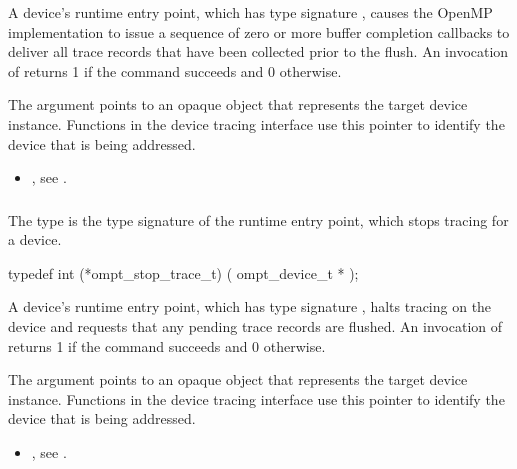 \descr
A device's  runtime entry point, which has type
signature , causes the OpenMP implementation to 
issue a sequence of zero or more buffer completion callbacks to deliver 
all trace records that have been collected prior to the flush. An invocation 
of  returns 1 if the command succeeds and 0 otherwise.

\argdesc
The  argument points to an opaque object that represents
the target device instance. Functions in the device tracing interface
use this pointer to identify the device that is being addressed.

\crossreferences
\begin{itemize}
\item {}, see .
\end{itemize}



\subsubsection{}
\label{sec:ompt_stop_trace_t}

\summary
The  type is the type signature of the 
 runtime entry point, which stops tracing for a device.

\begin{ccppspecific}
\begin{omptInquiry}
typedef int (*ompt_stop_trace_t) (
  ompt_device_t *
);
\end{omptInquiry}
\end{ccppspecific}

\descr
A device's  runtime entry point, which has type 
signature , halts tracing on the device and 
requests that any pending trace records are flushed. An invocation of 
 returns 1 if the command succeeds and 0 otherwise.

\argdesc
The  argument points to an opaque object that represents
the target device instance. Functions in the device tracing interface
use this pointer to identify the device that is being addressed.

\crossreferences
\begin{itemize}
\item {}, see .
\end{itemize}



